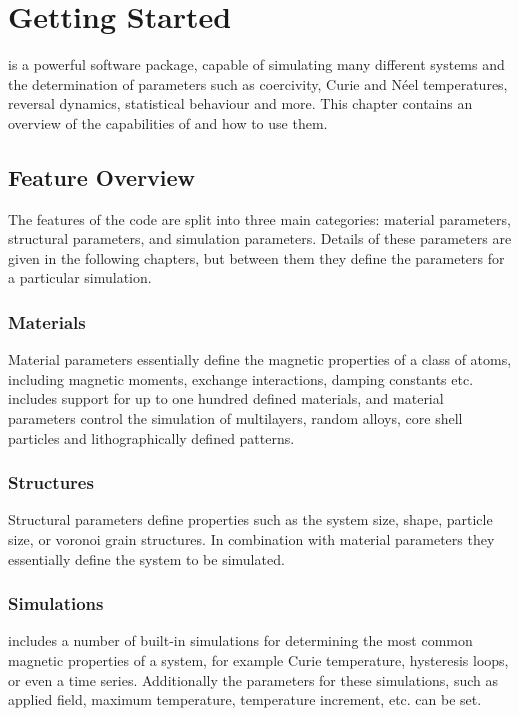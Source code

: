 \chapter{Getting Started}\label{chap:gettingstarted}

\vampire is a powerful software package, capable of simulating many different
systems and the determination of parameters such as coercivity, Curie and N\'eel
temperatures, reversal dynamics, statistical behaviour and more. This chapter
contains an overview of the capabilities of \vampire and how to use them.

\section*{Feature Overview}
The features of the \vampire code are split into three main categories: material
parameters, structural parameters, and simulation parameters. Details of these
parameters are given in the following chapters, but between them they define the
parameters for a particular simulation.

\subsection*{Materials}
Material parameters essentially define the magnetic properties of a class of
atoms, including magnetic moments, exchange interactions, damping constants etc.
\vampire includes support for up to one hundred defined materials, and material
parameters control the simulation of multilayers, random alloys, core shell
particles and lithographically defined patterns.

\subsection*{Structures}
Structural parameters define properties such as the system size, shape, particle
size, or voronoi grain structures. In combination with material parameters they
essentially define the system to be simulated.

\subsection*{Simulations}
\vampire includes a number of built-in simulations for determining the most
common magnetic properties of a system, for example Curie temperature,
hysteresis loops, or even a time series. Additionally the parameters for these
simulations, such as applied field, maximum temperature, temperature increment,
etc. can be set.

